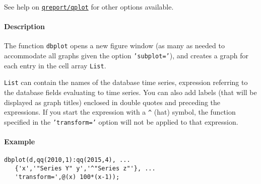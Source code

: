 See help on \href{qreport/qplot}{\texttt{qreport/qplot}} for other
options available.

\paragraph{Description}

The function \texttt{dbplot} opens a new figure window (as many as
needed to accommodate all graphs given the option \texttt{'subplot='}),
and creates a graph for each entry in the cell array \texttt{List}.

\texttt{List} can contain the names of the database time series,
expression referring to the database fields evaluating to time series.
You can also add labels (that will be displayed as graph titles)
enclosed in double quotes and preceding the expressions. If you start
the expression with a \texttt{\^{}} (hat) symbol, the function specified
in the \texttt{'transform='} option will not be applied to that
expression.

\paragraph{Example}

\begin{verbatim}
dbplot(d,qq(2010,1):qq(2015,4), ...
   {'x','"Series Y" y','^"Series z"'}, ...
   'transform=',@(x) 100*(x-1));
\end{verbatim}


